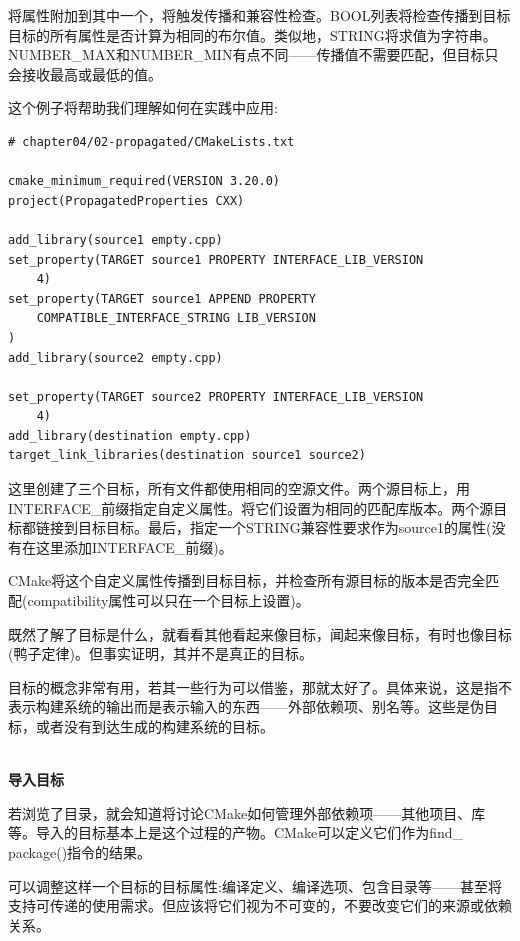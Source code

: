 将属性附加到其中一个，将触发传播和兼容性检查。BOOL列表将检查传播到目标目标的所有属性是否计算为相同的布尔值。类似地，STRING将求值为字符串。NUMBER\_MAX和NUMBER\_MIN有点不同——传播值不需要匹配，但目标只会接收最高或最低的值。

这个例子将帮助我们理解如何在实践中应用:

\begin{lstlisting}[style=styleCMake]
# chapter04/02-propagated/CMakeLists.txt

cmake_minimum_required(VERSION 3.20.0)
project(PropagatedProperties CXX)

add_library(source1 empty.cpp)
set_property(TARGET source1 PROPERTY INTERFACE_LIB_VERSION
	4)
set_property(TARGET source1 APPEND PROPERTY
	COMPATIBLE_INTERFACE_STRING LIB_VERSION
)
add_library(source2 empty.cpp)

set_property(TARGET source2 PROPERTY INTERFACE_LIB_VERSION
	4)
add_library(destination empty.cpp)
target_link_libraries(destination source1 source2)
\end{lstlisting}

这里创建了三个目标，所有文件都使用相同的空源文件。两个源目标上，用INTERFACE\_前缀指定自定义属性。将它们设置为相同的匹配库版本。两个源目标都链接到目标目标。最后，指定一个STRING兼容性要求作为source1的属性(没有在这里添加INTERFACE\_前缀)。

CMake将这个自定义属性传播到目标目标，并检查所有源目标的版本是否完全匹配(compatibility属性可以只在一个目标上设置)。

既然了解了目标是什么，就看看其他看起来像目标，闻起来像目标，有时也像目标(鸭子定律)。但事实证明，其并不是真正的目标。


目标的概念非常有用，若其一些行为可以借鉴，那就太好了。具体来说，这是指不表示构建系统的输出而是表示输入的东西——外部依赖项、别名等。这些是伪目标，或者没有到达生成的构建系统的目标。

\hspace*{\fill} \\ %
\noindent
\textbf{导入目标}

若浏览了目录，就会知道将讨论CMake如何管理外部依赖项——其他项目、库等。导入的目标基本上是这个过程的产物。CMake可以定义它们作为find\_ package()指令的结果。

可以调整这样一个目标的目标属性:编译定义、编译选项、包含目录等——甚至将支持可传递的使用需求。但应该将它们视为不可变的，不要改变它们的来源或依赖关系。

